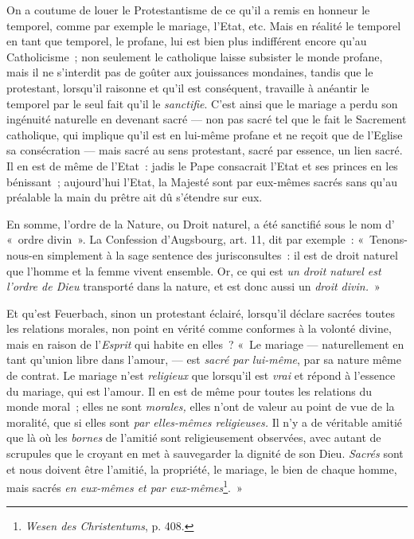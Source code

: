 \documentclass[french,twoside]{book} %
\begin{document}
\noindent On a coutume de louer le Protestantisme de ce qu’il a remis en honneur le temporel, comme par exemple le mariage, l’Etat, etc. Mais en réalité le temporel en tant que temporel, le profane, lui est bien plus indifférent encore qu’au Catholicisme ; non seulement le catholique laisse subsister le monde profane, mais il ne s’interdit pas de goûter aux jouissances mondaines, tandis que le protestant, lorsqu’il raisonne et qu’il est conséquent, travaille à anéantir le temporel par le seul fait qu’il le \emph{sanctifie}. C’est ainsi que le mariage a perdu son ingénuité naturelle en devenant sacré — non pas sacré tel que le fait le Sacrement catholique, qui implique qu’il est en lui-même profane et ne reçoit que de l’Eglise sa consécration — mais sacré au sens protestant, sacré par essence, un lien sacré. Il en est de même de l’Etat : jadis le Pape consacrait l’Etat et ses princes en les bénissant ; aujourd’hui l’Etat, la Majesté sont par eux-mêmes sacrés sans qu’au préalable la main du prêtre ait dû s’étendre sur eux.\par
En somme, l’ordre de la Nature, ou Droit naturel, a été sanctifié sous le nom d’ « ordre divin ». La Confession d’Augsbourg, art. 11, dit par exemple :  « Tenons-nous-en simplement à la sage sentence des jurisconsultes : il est de droit naturel que l’homme et la femme vivent ensemble. Or, ce qui est \emph{un droit naturel est l’ordre de Dieu} transporté dans la nature, et est donc aussi un \emph{droit divin.} »\par
Et qu’est Feuerbach, sinon un protestant éclairé, lorsqu’il déclare sacrées toutes les relations morales, non point en vérité comme conformes à la volonté divine, mais en raison de l’\emph{Esprit} qui habite en elles ? « Le mariage — naturellement en tant qu’union libre dans l’amour, — est \emph{sacré par lui-même}, par sa nature même de contrat. Le mariage n’est \emph{religieux} que lorsqu’il est \emph{vrai} et répond à l’essence du mariage, qui est l’amour. Il en est de même pour toutes les relations du monde moral ; elles ne sont \emph{morales,} elles n’ont de valeur au point de vue de la moralité, que si elles sont \emph{par elles-mêmes religieuses.} Il n’y a de véritable amitié que là où les \emph{bornes} de l’amitié sont religieusement observées, avec autant de scrupules que le croyant en met à sauvegarder la dignité de son Dieu. \emph{Sacrés} sont et nous doivent être l’amitié, la propriété, le mariage, le bien de chaque homme, mais sacrés \emph{en eux-mêmes et par eux-mêmes}\footnote{ \noindent \emph{Wesen des Christentums}, p. 408.
 }. »\par
\end{document}
